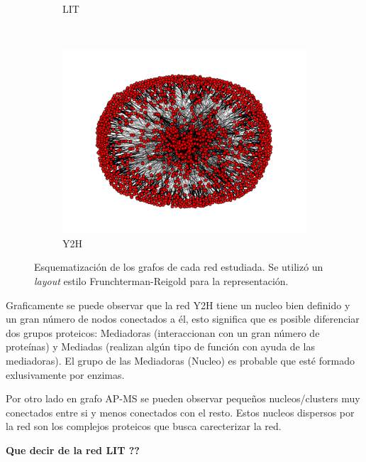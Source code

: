 \begin{figure}[!ht]
\begin{subfigure}[b]{0.40\columnwidth}
        \caption{\label{fig:LIT}LIT}
    \end{subfigure}
    \\
    \begin{subfigure}[b]{0.40\columnwidth}
        \includegraphics[width=\textwidth]{./schemes/yeast_Y2H.pdf}
        \caption{\label{fig:y2h} Y2H}
    \end{subfigure}
    \caption{\label{fig:ej1_grafos} Esquematizaci\'on de los grafos de cada 
    red estudiada. Se utiliz\'o un \textit{layout} estilo Frunchterman-Reigold 
    para la representaci\'on.}
\end{figure}

Graficamente se puede observar que la red Y2H tiene un nucleo bien definido
y un gran n\'umero de nodos conectados a \'el, esto significa que es posible
diferenciar dos grupos proteicos: Mediadoras (interaccionan con un gran
n\'umero de prote\'inas) y Mediadas (realizan alg\'un tipo de funci\'on con
ayuda de las mediadoras). El grupo de las Mediadoras (Nucleo) es probable 
que est\'e formado exlusivamente por enzimas.

Por otro lado en grafo AP-MS se pueden observar peque\~nos nucleos/clusters
muy conectados entre si y menos conectados con el resto. Estos nucleos dispersos
por la red son los complejos proteicos que busca carecterizar la red. 

\textbf{Que decir de la red LIT ??}\\


